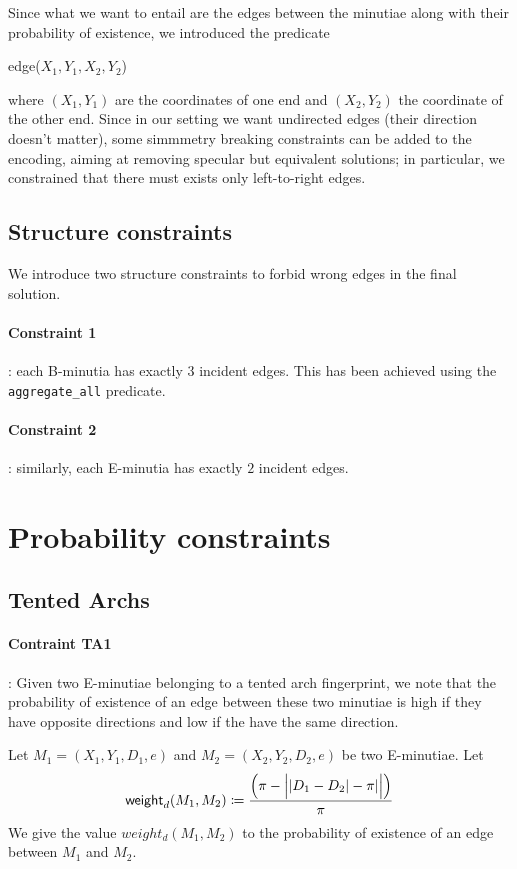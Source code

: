 \documentclass[8pt]{article}
\begin{document}
Since what we want to entail are the edges between the minutiae along
with their probability of existence, we introduced the predicate
  \begin{center}
    \textsf{edge($X_1,Y_1,X_2,Y_2$)}
  \end{center}
where $(X_1,Y_1)$ are the coordinates of one end and $(X_2,Y_2)$
the coordinate of the other end.
Since in our setting we want undirected edges (their direction doesn't
matter), some simmmetry breaking constraints can be added to the 
encoding, aiming at removing specular but equivalent solutions; in
particular, we constrained that there must exists only left-to-right
edges.

\subsection{Structure constraints}
We introduce two structure constraints to forbid wrong edges
in the final solution.
\paragraph{Constraint 1}:
each B-minutia has exactly $3$ incident edges. This has been achieved
using the \texttt{aggregate\_all} predicate.
\paragraph{Constraint 2}:
similarly, each E-minutia has exactly $2$ incident edges.


\section{Probability constraints}
\subsection{Tented Archs}
\paragraph{Contraint TA1}:
Given two E-minutiae belonging to a tented arch fingerprint, we note that 
the probability of existence of an edge between these two minutiae 
is high if they have opposite directions and low if the have 
the same direction.

Let $M_1=(X_1,Y_1,D_1,e)$ and $M_2=(X_2,Y_2,D_2,e)$ be two E-minutiae.
Let 
  \begin{align*}
    \textsf{weight}_d(M_1,M_2) \coloneqq 
    \frac{
      \left( \pi - \Big\lvert \lvert D_1-D_2 \rvert - 
      \pi \rvert\Big\rvert \right)}{\pi}
  \end{align*} 
We give the value $weight_d(M_1,M_2)$ to the probability of existence of
an edge between $M_1$ and $M_2$.
\end{document}
